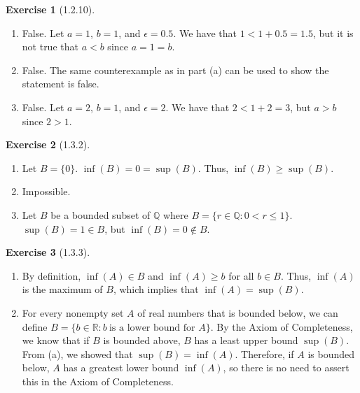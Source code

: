 \documentclass{amsart}
\theoremstyle{definition}
\newtheorem{exercise}{Exercise}
\newcommand{\Q}{\mathbb{Q}}
\newcommand{\R}{\mathbb{R}}
\newcommand{\st}{\mathrel{:}}
\begin{document}
\begin{exercise}[1.2.10]
  \begin{enumerate}[label={(\alph*)}]
    \item False. Let $a = 1$, $b = 1$, and $\epsilon = 0.5$. We have that $1 < 1
      + 0.5 = 1.5$, but it is not true that $a < b$ since $a = 1 = b$.
    \item False. The same counterexample as in part (a) can be used to show the
      statement is false.
    \item False. Let $a = 2$, $b = 1$, and $\epsilon = 2$. We have that $2 < 1 +
      2 = 3$, but $a > b$ since $2 > 1$.
  \end{enumerate}
\end{exercise}

\begin{exercise}[1.3.2]
  \begin{enumerate}[label={(\alph*)}]
    \item Let $B = \{0\}$. $\inf(B) = 0 = \sup(B)$. Thus, $\inf(B) \ge \sup(B)$.
    \item Impossible.
    \item Let $B$ be a bounded subset of $\Q$ where $B = \{r \in \Q \st 0 < r
      \le 1 \}$. $\sup(B) = 1 \in B$, but $\inf(B) = 0 \notin B$.
  \end{enumerate}
\end{exercise}

\begin{exercise}[1.3.3]
  \begin{enumerate}[label={(\alph*)}]
    \item By definition, $\inf(A) \in B$ and $\inf(A) \ge b$ for all $b \in B$.
      Thus, $\inf(A)$ is the maximum of $B$, which implies that $\inf(A) =
      \sup(B)$.
    \item For every nonempty set $A$ of real numbers that is bounded below, we
      can define $B = \{b \in \R \st b\ \text{is a lower bound for $A$}\}$. By
      the Axiom of Completeness, we know that if $B$ is bounded above, $B$ has a
      least upper bound $\sup(B)$. From (a), we showed that $\sup(B) = \inf(A)$.
      Therefore, if $A$ is bounded below, $A$ has a greatest lower bound
      $\inf(A)$, so there is no need to assert this in the Axiom of
      Completeness.
  \end{enumerate}
\end{exercise}
\end{document}
